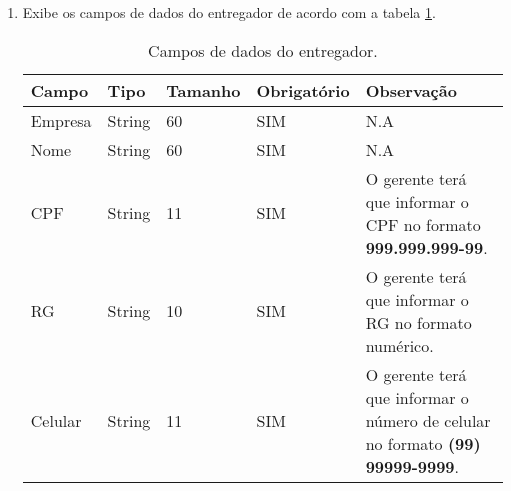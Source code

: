 \begin{enumerate}[label=RN\arabic*]
	\item Exibe os campos de dados do entregador de acordo com a tabela \ref{uc003_tb_rn1}. \label{uc003_rn:1}
	\begin{table}[htb]
		\ABNTEXfontereduzida
		\caption[Campos de dados do entregador]{Campos de dados do entregador.}
		\label{uc003_tb_rn1}
		\begin{tabular}{|p{3.0cm}|p{2.0cm}|p{1.5cm}|p{2.0cm}|p{5.75cm}|}
			\hline
			\textbf{Campo} & \textbf{Tipo} & \textbf{Tamanho} & \textbf{Obrigatório} & \textbf{Observação}                                                                  \\ \hline
			Empresa        & String        & 60               & SIM                  & N.A                                                                                  \\ \hline
			Nome           & String        & 60               & SIM                  & N.A                                                                                  \\ \hline
			CPF            & String        & 11               & SIM                  & O gerente terá que informar o CPF no formato \textbf{999.999.999-99}.                \\ \hline
			RG             & String        & 10               & SIM                  & O gerente terá que informar o RG no formato numérico.                                \\ \hline
			Celular        & String        & 11               & SIM                  & O gerente terá que informar o número de celular no formato \textbf{(99) 99999-9999}. \\ \hline
		\end{tabular}
	\end{table}
\end{enumerate}